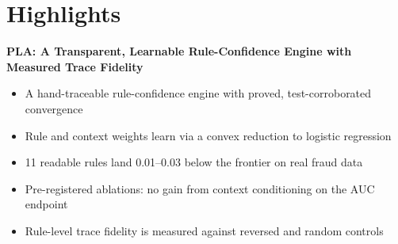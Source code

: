 \documentclass[12pt]{article}
\begin{document}
\section*{Highlights}

\textbf{PLA: A Transparent, Learnable Rule-Confidence Engine with
Measured Trace Fidelity}

\begin{itemize}
\item A hand-traceable rule-confidence engine with proved, test-corroborated convergence
\item Rule and context weights learn via a convex reduction to logistic regression
\item 11 readable rules land 0.01--0.03 below the frontier on real fraud data
\item Pre-registered ablations: no gain from context conditioning on the AUC endpoint
\item Rule-level trace fidelity is measured against reversed and random controls
\end{itemize}
\end{document}
